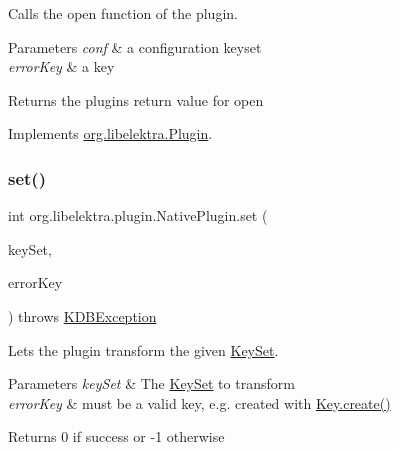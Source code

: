 Calls the open function of the plugin. 


\begin{DoxyParams}{Parameters}
{\em conf} & a configuration keyset \\
\hline
{\em error\+Key} & a key \\
\hline
\end{DoxyParams}
\begin{DoxyReturn}{Returns}
the plugin\textquotesingle{}s return value for open 
\end{DoxyReturn}


Implements \hyperlink{interfaceorg_1_1libelektra_1_1Plugin_a740f0602ea62e7a28c86fc801add8907}{org.\+libelektra.\+Plugin}.

\mbox{\label{classorg_1_1libelektra_1_1plugin_1_1NativePlugin_a9faeb1e6eb90a4c90681eeeb097eeb53}} 
\subsubsection{\texorpdfstring{set()}{set()}}
{\footnotesize\ttfamily int org.\+libelektra.\+plugin.\+Native\+Plugin.\+set (\begin{DoxyParamCaption}\item[{\hyperlink{classorg_1_1libelektra_1_1KeySet}{Key\+Set}}]{key\+Set,  }\item[{\hyperlink{classorg_1_1libelektra_1_1Key}{Key}}]{error\+Key }\end{DoxyParamCaption}) throws \hyperlink{classorg_1_1libelektra_1_1exception_1_1KDBException}{K\+D\+B\+Exception}\hspace{0.3cm}{\ttfamily [inline]}}



Lets the plugin transform the given \hyperlink{classorg_1_1libelektra_1_1KeySet}{Key\+Set}. 


\begin{DoxyParams}{Parameters}
{\em key\+Set} & The \hyperlink{classorg_1_1libelektra_1_1KeySet}{Key\+Set} to transform \\
\hline
{\em error\+Key} & must be a valid key, e.\+g. created with \hyperlink{classorg_1_1libelektra_1_1Key_af407cf43625618af4e7fb2576037fcfc}{Key.\+create()} \\
\hline
\end{DoxyParams}
\begin{DoxyReturn}{Returns}
0 if success or -\/1 otherwise 
\end{DoxyReturn}

